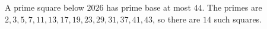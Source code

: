A prime square below $2026$ has prime base at most $44$. The primes are $2,3,5,7,11,13,17,19,23,29,31,37,41,43$, so there are $\boxed{14}$ such squares.
